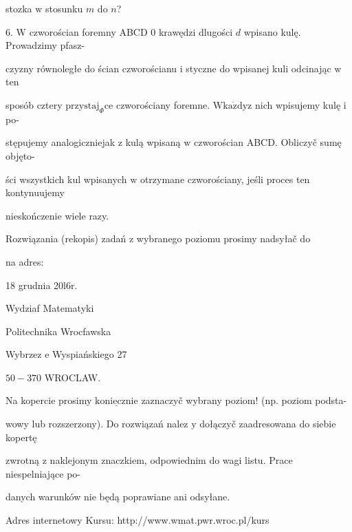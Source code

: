 \documentclass[a4paper,12pt]{article}
\begin{document}
stozka $\mathrm{w}$ stosunku $m$ do $n$?

6. $\mathrm{W}$ czworościan foremny ABCD $0$ krawędzi dlugości $d$ wpisano kulę. Prowadzimy pfasz-

czyzny równoległe do ścian czworościanu $\mathrm{i}$ styczne do wpisanej kuli odcinając $\mathrm{w}$ ten

sposób cztery $\mathrm{p}\mathrm{r}\mathrm{z}\mathrm{y}\mathrm{s}\mathrm{t}\mathrm{a}\mathrm{j}_{\Phi}\mathrm{c}\mathrm{e}$ czworościany foremne. $\mathrm{W}\mathrm{k}\mathrm{a}\dot{\mathrm{z}}\mathrm{d}\mathrm{y}\mathrm{z}$ nich wpisujemy kulę $\mathrm{i}$ po-

stępujemy analogiczniejak $\mathrm{z}$ kulą wpisaną $\mathrm{w}$ czworościan ABCD. Obliczyč sumę objęto-

ści wszystkich kul wpisanych $\mathrm{w}$ otrzymane czworościany, jeśli proces ten kontynuujemy

nieskończenie wiele razy.

Rozwiązania (rekopis) zadań z wybranego poziomu prosimy nadsyłač do

na adres:

18 grudnia 20l6r.

Wydziaf Matematyki

Politechnika Wrocfawska

Wybrzez $\mathrm{e}$ Wyspiańskiego 27

$50-370$ WROCLAW.

Na kopercie prosimy $\underline{\mathrm{k}\mathrm{o}\mathrm{n}\mathrm{i}\mathrm{e}\mathrm{c}\mathrm{z}\mathrm{n}\mathrm{i}\mathrm{e}}$ zaznaczyč wybrany poziom! (np. poziom podsta-

wowy lub rozszerzony). Do rozwiązań nalez $\mathrm{y}$ dołączyč zaadresowana do siebie kopertę

zwrotną $\mathrm{z}$ naklejonym znaczkiem, odpowiednim do wagi listu. Prace niespelniające po-

danych warunków nie będą poprawiane ani odsyłane.

Adres internetowy Kursu: http://www.wmat.pwr.wroc.pl/kurs
\end{document}
